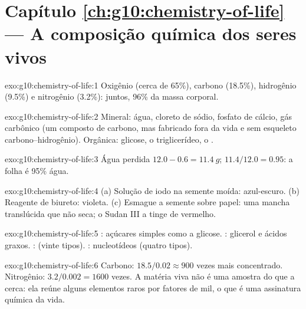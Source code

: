 \section*{Capítulo \ref{ch:g10:chemistry-of-life} --- A composição química dos seres vivos}

\begin{solution}{exo:g10:chemistry-of-life:1}
Oxigênio (cerca de 65\%), carbono (18.5\%), hidrogênio (9.5\%) e
nitrogênio (3.2\%): juntos, 96\% da massa corporal.
\end{solution}

\begin{solution}{exo:g10:chemistry-of-life:2}
Mineral: água, cloreto de sódio, fosfato de cálcio, gás carbônico (um
composto de carbono, mas fabricado fora da vida e sem esqueleto
carbono--hidrogênio). Orgânica: glicose, o triglicerídeo, o .
\end{solution}

\begin{solution}{exo:g10:chemistry-of-life:3}
Água perdida $12.0 - 0.6 = \qty{11.4}{g}$; $11.4/12.0 = 0.95$: a folha
é 95\% água.
\end{solution}

\begin{solution}{exo:g10:chemistry-of-life:4}
(a) Solução de iodo na semente moída: azul-escuro. (b) Reagente de
biureto: violeta. (c) Esmague a semente sobre papel: uma mancha
translúcida que não seca; o Sudan III a tinge de vermelho.
\end{solution}

\begin{solution}{exo:g10:chemistry-of-life:5}
: açúcares simples como a glicose. : glicerol e
ácidos graxos. :  (vinte tipos). :
nucleotídeos (quatro tipos).
\end{solution}

\begin{solution}{exo:g10:chemistry-of-life:6}
Carbono: $18.5/0.02 \approx 900$ vezes mais concentrado. Nitrogênio:
$3.2/0.002 = 1600$ vezes. A matéria viva não é uma amostra do que a
cerca: ela reúne alguns elementos raros por fatores de mil, o que é uma
assinatura química da vida.
\end{solution}

